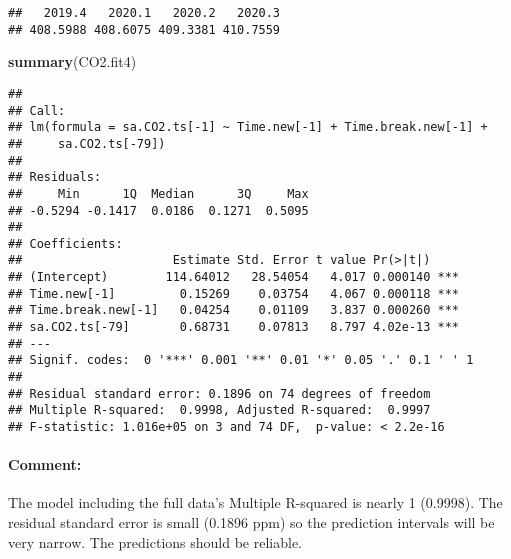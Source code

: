 \documentclass[]{article}
\newenvironment{Shaded}{\begin{snugshade}}{\end{snugshade}}
\newcommand{\DecValTok}[1]{\textcolor[rgb]{0.00,0.00,0.81}{#1}}
\newcommand{\KeywordTok}[1]{\textcolor[rgb]{0.13,0.29,0.53}{\textbf{#1}}}
\newcommand{\NormalTok}[1]{#1}
\newcommand{\OperatorTok}[1]{\textcolor[rgb]{0.81,0.36,0.00}{\textbf{#1}}}
\newcommand{\StringTok}[1]{\textcolor[rgb]{0.31,0.60,0.02}{#1}}
\let\oldparagraph\paragraph
\renewcommand{\paragraph}[1]{\oldparagraph{#1}\mbox{}}
\begin{document}
\begin{Shaded}
\end{Shaded}

\begin{verbatim}
##   2019.4   2020.1   2020.2   2020.3 
## 408.5988 408.6075 409.3381 410.7559
\end{verbatim}

\begin{Shaded}
\begin{Highlighting}[]
\KeywordTok{summary}\NormalTok{(CO2.fit4)}
\end{Highlighting}
\end{Shaded}

\begin{verbatim}
## 
## Call:
## lm(formula = sa.CO2.ts[-1] ~ Time.new[-1] + Time.break.new[-1] + 
##     sa.CO2.ts[-79])
## 
## Residuals:
##     Min      1Q  Median      3Q     Max 
## -0.5294 -0.1417  0.0186  0.1271  0.5095 
## 
## Coefficients:
##                     Estimate Std. Error t value Pr(>|t|)    
## (Intercept)        114.64012   28.54054   4.017 0.000140 ***
## Time.new[-1]         0.15269    0.03754   4.067 0.000118 ***
## Time.break.new[-1]   0.04254    0.01109   3.837 0.000260 ***
## sa.CO2.ts[-79]       0.68731    0.07813   8.797 4.02e-13 ***
## ---
## Signif. codes:  0 '***' 0.001 '**' 0.01 '*' 0.05 '.' 0.1 ' ' 1
## 
## Residual standard error: 0.1896 on 74 degrees of freedom
## Multiple R-squared:  0.9998, Adjusted R-squared:  0.9997 
## F-statistic: 1.016e+05 on 3 and 74 DF,  p-value: < 2.2e-16
\end{verbatim}

\hypertarget{comment-3}{%
\paragraph{Comment:}\label{comment-3}}

The model including the full data's Multiple R-squared is nearly 1
(0.9998). The residual standard error is small (0.1896 ppm) so the
prediction intervals will be very narrow. The predictions should be
reliable.
\end{document}
